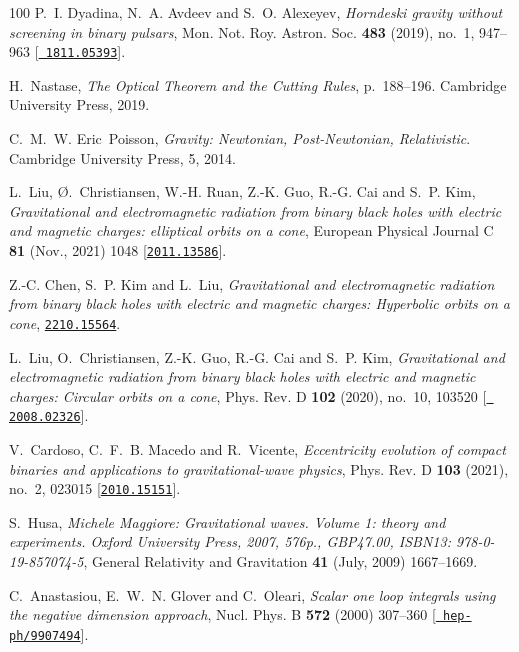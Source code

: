 \begin{thebibliography}{100}
P.~I. Dyadina, N.~A. Avdeev and S.~O. Alexeyev,  {\em {Horndeski gravity
  without screening in binary pulsars}}, Mon. Not. Roy. Astron. Soc. {\bf 483}
  (2019), no.~1, 947--963 [\href{http://www.arXiv.org/abs/1811.05393}{{\tt
  1811.05393}}].

H.~Nastase, {\em The Optical Theorem and the Cutting Rules}, p.~188–196.
\newblock Cambridge University Press, 2019.

C.~M.~W. Eric~Poisson, {\em {Gravity: Newtonian, Post-Newtonian,
  Relativistic}}.
\newblock Cambridge University Press, 5, 2014.

L.~{Liu}, {\O}.~{Christiansen}, W.-H. {Ruan}, Z.-K. {Guo}, R.-G. {Cai} and
  S.~P. {Kim},  {\em {Gravitational and electromagnetic radiation from binary
  black holes with electric and magnetic charges: elliptical orbits on a
  cone}}, European Physical Journal C {\bf 81} (Nov., 2021) 1048
  [\href{http://www.arXiv.org/abs/2011.13586}{{\tt 2011.13586}}].

Z.-C. Chen, S.~P. Kim and L.~Liu,  {\em {Gravitational and electromagnetic
  radiation from binary black holes with electric and magnetic charges:
  Hyperbolic orbits on a cone}},
  \href{http://www.arXiv.org/abs/2210.15564}{{\tt 2210.15564}}.

L.~Liu, O.~Christiansen, Z.-K. Guo, R.-G. Cai and S.~P. Kim,  {\em
  {Gravitational and electromagnetic radiation from binary black holes with
  electric and magnetic charges: Circular orbits on a cone}}, Phys. Rev. D {\bf
  102} (2020), no.~10, 103520 [\href{http://www.arXiv.org/abs/2008.02326}{{\tt
  2008.02326}}].

V.~Cardoso, C.~F.~B. Macedo and R.~Vicente,  {\em {Eccentricity evolution of
  compact binaries and applications to gravitational-wave physics}}, Phys. Rev.
  D {\bf 103} (2021), no.~2, 023015
  [\href{http://www.arXiv.org/abs/2010.15151}{{\tt 2010.15151}}].

S.~{Husa},  {\em {Michele Maggiore: Gravitational waves. Volume 1: theory and
  experiments. Oxford University Press, 2007, 576p., GBP47.00, ISBN13:
  978-0-19-857074-5}}, General Relativity and Gravitation {\bf 41} (July, 2009)
  1667--1669.

C.~Anastasiou, E.~W.~N. Glover and C.~Oleari,  {\em {Scalar one loop integrals
  using the negative dimension approach}}, Nucl. Phys. B {\bf 572} (2000)
  307--360 [\href{http://www.arXiv.org/abs/hep-ph/9907494}{{\tt
  hep-ph/9907494}}].


\end{thebibliography}
